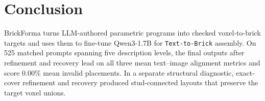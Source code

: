 \section{Conclusion}
BrickForma turns LLM-authored parametric programs into checked voxel-to-brick targets and uses them to fine-tune Qwen3-1.7B for \texttt{Text-to-Brick} assembly. On 525 matched prompts spanning five description levels, the final outputs after refinement and recovery lead on all three mean text--image alignment metrics and score 0.00\% mean invalid placements. In a separate structural diagnostic, exact-cover refinement and recovery produced stud-connected layouts that preserve the target voxel unions.
